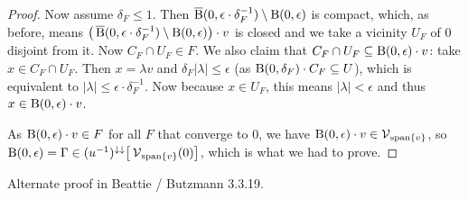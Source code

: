 \begin{proof}
Now assume $\delta_F \leq 1$. Then $\operatorname{\overline{B}}(0, \epsilon\cdot\delta_F^{-1})\setminus \operatorname{B}(0,\epsilon)$ is compact, which, as before, means $\big(\operatorname{\overline{B}}(0, \epsilon\cdot\delta_F^{-1})\setminus \operatorname{B}(0,\epsilon)\big)\cdot v$ is closed and we take a vicinity $U_F$ of $0$ disjoint from it. Now $C_F\cap U_F\in F$. We also claim that $C_F\cap U_F\subseteq \operatorname{B}(0,\epsilon)\cdot v$: take $x\in C_F\cap U_F$. Then $x = \lambda v$ and $\delta_F |\lambda| \leq \epsilon$ (as $\operatorname{B}(0, \delta_F)\cdot C_F \subseteq U$), which is equivalent to $|\lambda| \leq \epsilon\cdot\delta_F^{-1}$. Now because $x\in U_F$, this means $|\lambda| < \epsilon$ and thus $x\in \operatorname{B}(0,\epsilon)\cdot v$.

As $\operatorname{B}(0,\epsilon)\cdot v \in F$ for all $F$ that converge to $0$, we have $\operatorname{B}(0,\epsilon)\cdot v\in \operatorname{\mathcal{V}}_{\operatorname{span}\{v\}}$, so $\operatorname{B}(0,\epsilon) = \Gamma \in (u^{-1})^{\downarrow\downarrow}\big[\operatorname{\mathcal{V}}_{\operatorname{span}\{v\}}(0)\big]$, which is what we had to prove.
\end{proof}

Alternate proof in Beattie / Butzmann 3.3.19.


